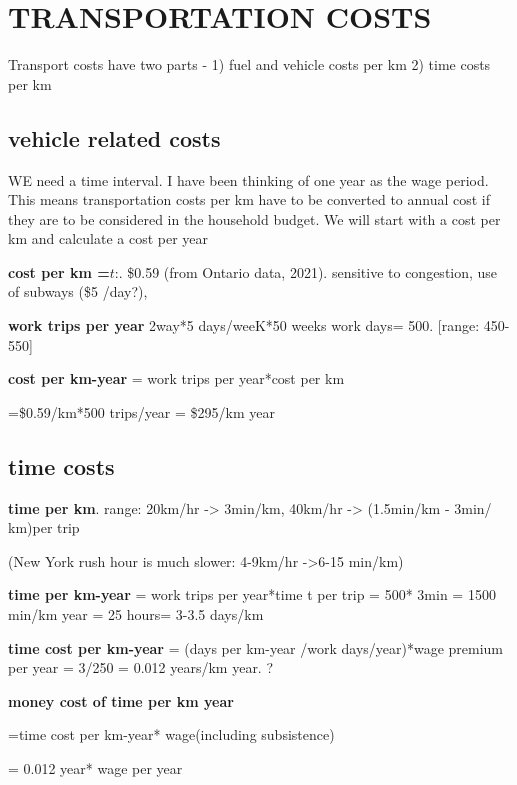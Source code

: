 \section{TRANSPORTATION COSTS}
Transport costs have two parts -  
1) fuel and vehicle costs per km
2) time costs per km


\subsection{vehicle related costs}
WE need a time interval. I have been thinking of one year as the wage period. This means transportation costs per km have to be converted to annual cost if they are to be considered in the household budget. We will start with a cost per km and calculate a cost per year

\textbf{cost per km =$\textit{t}$}:. \$0.59   (from  Ontario data, 2021). sensitive to congestion, use of subways (\$5 /day?), 

 \textbf{work trips per year} 2way*5 days/weeK*50 weeks work days= 500. [range: 450-550]

\textbf{cost per km-year} = work trips per year*cost per km

=\$0.59/km*500 trips/year  =  \$295/km year 



\subsection{time costs}
\textbf{time per km}. range: 20km/hr -> 3min/km, 40km/hr -> (1.5min/km - 3min/ km)per trip 

(New York rush hour is much slower:  4-9km/hr ->6-15 min/km)

\textbf{time  per km-year} = work trips per year*time t per trip = 500* 3min  = 1500 min/km year = 25 hours= 3-3.5 days/km
 
\textbf{time cost per km-year} =  (days per km-year /work days/year)*wage premium per year  = 3/250 = 0.012 years/km year. ?

\textbf{money cost of time per km year} 

=time cost per km-year* wage(including subsistence) 

= 0.012 year* wage per year

